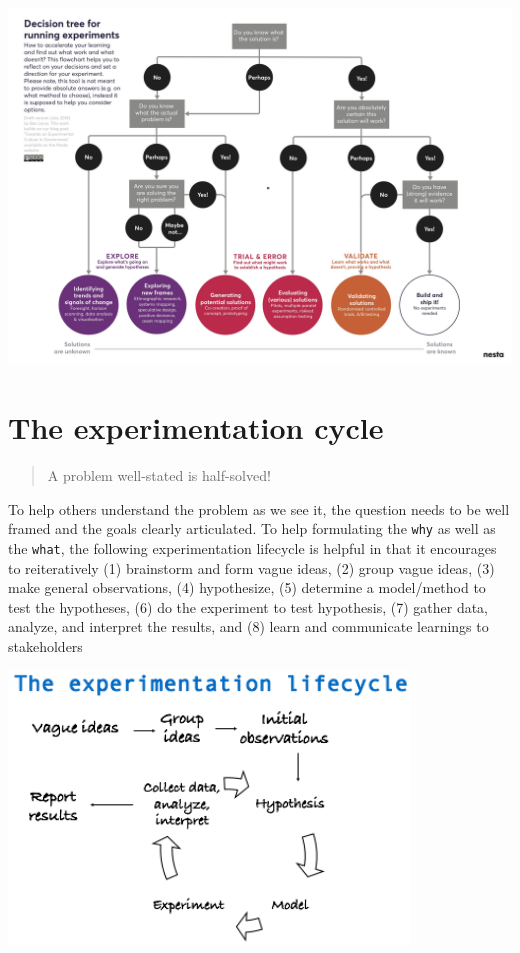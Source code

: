\documentclass[]{book}
\begin{document}
\includegraphics{fig/decision_tree.jpeg}

\hypertarget{the-experimentation-cycle}{%
\section{The experimentation cycle}\label{the-experimentation-cycle}}

\begin{quote}
A problem well-stated is half-solved!
\end{quote}

To help others understand the problem as we see it, the question needs to be well framed and the goals clearly articulated. To help formulating the \texttt{why} as well as the \texttt{what}, the following experimentation lifecycle is helpful in that it encourages to reiteratively (1) brainstorm and form vague ideas, (2) group vague ideas, (3) make general observations, (4) hypothesize, (5) determine a model/method to test the hypotheses, (6) do the experiment to test hypothesis, (7) gather data, analyze, and interpret the results, and (8) learn and communicate learnings to stakeholders

\includegraphics[width=0.8\textwidth,height=\textheight]{fig/experiment_lifecycle.png}
\end{document}
